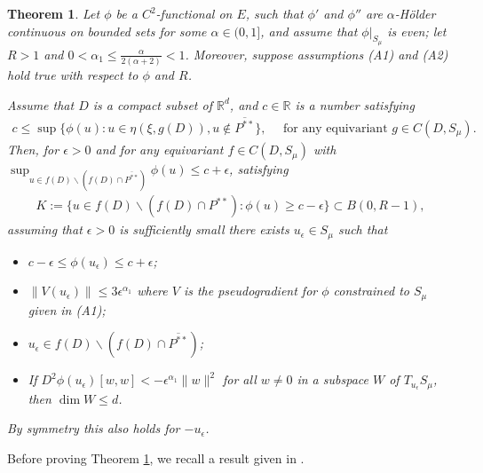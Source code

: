 \documentclass[10pt,a4paper]{article}
\newtheorem{theorem}{Theorem}[section]
\theoremstyle{definition} \theoremstyle{remark}
\numberwithin{equation}{section}
\newcommand{\R}{\mathbb{R}}
\newcommand{\ep}{\epsilon}
\begin{document}
\begin{theorem} \label{thmuepsym}
	Let $\phi$ be a $C^2$-functional on $E$, such that $\phi'$ and $\phi''$ are $\alpha$-H\"older continuous on bounded sets for some $\alpha \in (0,1]$, and assume that $\phi|_{S_\mu}$ is even; let $R > 1$ and $0 < \alpha_1 \leq \frac{\alpha}{2(\alpha + 2)} < 1$. Moreover, suppose assumptions (A1) and (A2) hold true with respect to $\phi$ and $R$.
	
	Assume that $D$ is a compact subset of $\R^d$, and $c \in \R$ is a number satisfying
	\begin{align} \label{eqsup>c}
		c \le \sup\bigl\{\phi(u): u \in \eta(\xi,g(D)), u \notin \overline{P^{**}} \bigr\}, \quad \text{ for any equivariant } g \in C(D,S_\mu).
	\end{align}
	Then, for $\ep >0$ and for any equivariant $f \in C(D,S_\mu)$ with  $\sup_{u \in f(D) \backslash (f(D) \cap \overline{P^{**}})}\phi(u)\leq c + \ep$, satisfying
	\begin{align} \label{eqboundedballsym}
		K := \bigl\{u \in f(D) \backslash (f(D) \cap P^{**}): \phi(u) \geq c -\ep \bigr\} \subset B(0,R-1),
	\end{align}
	assuming that $\ep > 0$ is sufficiently small there exists $u_\ep \in S_\mu$ such that
	\begin{itemize}
		\item[(1)] $c - \ep \leq \phi(u_\ep) \leq c + \ep$;
		\item[(2)] $\|V(u_\ep)\| \leq 3\ep^{\alpha_1}$ where $V$ is the pseudogradient for $\phi$ constrained to $S_\mu$ given in (A1);
		\item[(3)] $u_\ep \in f(D) \backslash (f(D) \cap \overline{P^{**}})$;
		\item[(4)] If $D^2\phi(u_\ep)[w, w] < -\ep^{\alpha_1} \|w\|^2$ for all $w \neq 0$ in a subspace $W$ of $T_{u_\ep}S_\mu$, then $\dim W \leq d$.
	\end{itemize}
	By symmetry this also holds for $-u_\ep$.
\end{theorem}

Before proving Theorem \ref{thmuepsym}, we recall a result given in \cite{BCJN}.
\end{document}
